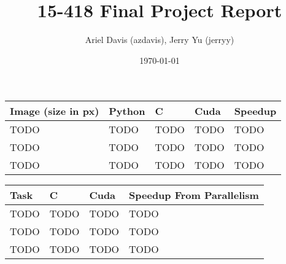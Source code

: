 \documentclass[12pt]{article}
\author{Ariel Davis (azdavis), Jerry Yu (jerryy)}
\date{\today}
\title{15-418 Final Project Report}
\begin{document}
\maketitle

\begin{tabular}{l|l|l|l|l}
    Image (size in px) & Python & C & Cuda & Speedup \\
    \hline
    TODO & TODO & TODO & TODO & TODO \\
    TODO & TODO & TODO & TODO & TODO \\
    TODO & TODO & TODO & TODO & TODO
\end{tabular}

\begin{tabular}{l|l|l|l}
    Task & C & Cuda & Speedup From Parallelism\\
    \hline
    TODO & TODO & TODO & TODO \\
    TODO & TODO & TODO & TODO \\
    TODO & TODO & TODO & TODO
\end{tabular}
\end{document}
